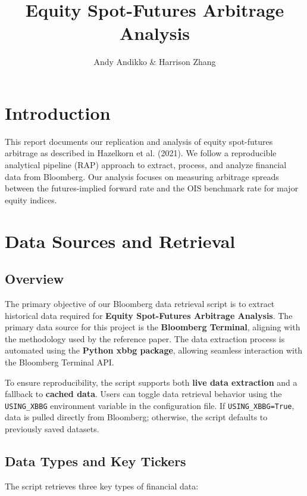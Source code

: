 \documentclass{article}
\title{Equity Spot-Futures Arbitrage Analysis}
\author{Andy Andikko & Harrison Zhang}
\begin{document}
\maketitle

\section{Introduction}
This report documents our replication and analysis of equity spot-futures arbitrage as described in Hazelkorn et al. (2021). We follow a reproducible analytical pipeline (RAP) approach to extract, process, and analyze financial data from Bloomberg. Our analysis focuses on measuring arbitrage spreads between the futures-implied forward rate and the OIS benchmark rate for major equity indices.

\section{Data Sources and Retrieval}
\subsection{Overview}
The primary objective of our Bloomberg data retrieval script is to extract historical data required for \textbf{Equity Spot-Futures Arbitrage Analysis}. The primary data source for this project is the \textbf{Bloomberg Terminal}, aligning with the methodology used by the reference paper. The data extraction process is automated using the \textbf{Python xbbg package}, allowing seamless interaction with the Bloomberg Terminal API.

To ensure reproducibility, the script supports both \textbf{live data extraction} and a fallback to \textbf{cached data}. Users can toggle data retrieval behavior using the \texttt{USING\_XBBG} environment variable in the configuration file. If \texttt{USING\_XBBG=True}, data is pulled directly from Bloomberg; otherwise, the script defaults to previously saved datasets.

\subsection{Data Types and Key Tickers}
The script retrieves three key types of financial data:
\end{document}
